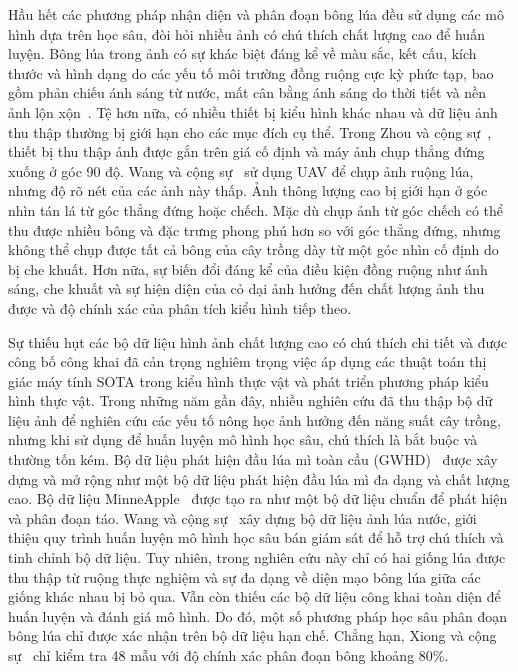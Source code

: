 \documentclass[12pt, a4paper]{article}
\begin{document}
Hầu hết các phương pháp nhận diện và phân đoạn bông lúa đều sử dụng các mô hình dựa trên
học sâu, đòi hỏi nhiều ảnh có chú thích chất lượng cao để huấn luyện. Bông lúa trong ảnh có
sự khác biệt đáng kể về màu sắc, kết cấu, kích thước và hình dạng do các yếu tố môi trường
đồng ruộng cực kỳ phức tạp, bao gồm phản chiếu ánh sáng từ nước, mất cân bằng ánh sáng do
thời tiết và nền ảnh lộn xộn~\cite{xiong2017}. Tệ hơn nữa, có nhiều thiết bị kiểu hình khác
nhau và dữ liệu ảnh thu thập thường bị giới hạn cho các mục đích cụ thể. Trong Zhou và cộng
sự~\cite{zhou2023}, thiết bị thu thập ảnh được gắn trên giá cố định và máy ảnh chụp thẳng
đứng xuống ở góc 90 độ. Wang và cộng sự~\cite{wang2021} sử dụng UAV để chụp ảnh ruộng lúa,
nhưng độ rõ nét của các ảnh này thấp. Ảnh thông lượng cao bị giới hạn ở góc nhìn tán lá từ
góc thẳng đứng hoặc chếch. Mặc dù chụp ảnh từ góc chếch có thể thu được nhiều bông và đặc
trưng phong phú hơn so với góc thẳng đứng, nhưng không thể chụp được tất cả bông của cây
trồng dày từ một góc nhìn cố định do bị che khuất. Hơn nữa, sự biến đổi đáng kể của điều
kiện đồng ruộng như ánh sáng, che khuất và sự hiện diện của cỏ dại ảnh hưởng đến chất lượng
ảnh thu được và độ chính xác của phân tích kiểu hình tiếp theo.

Sự thiếu hụt các bộ dữ liệu hình ảnh chất lượng cao có chú thích chi tiết và được công bố
công khai đã cản trọng nghiêm trọng việc áp dụng các thuật toán thị giác máy tính SOTA trong
kiểu hình thực vật và phát triển phương pháp kiểu hình thực vật. Trong những năm gần đây,
nhiều nghiên cứu đã thu thập bộ dữ liệu ảnh để nghiên cứu các yếu tố nông học ảnh hưởng đến
năng suất cây trồng, nhưng khi sử dụng để huấn luyện mô hình học sâu, chú thích là bắt buộc
và thường tốn kém. Bộ dữ liệu phát hiện đầu lúa mì toàn cầu (GWHD)~\cite{david2020,
david2021} được xây dựng và mở rộng như một bộ dữ liệu phát hiện đầu lúa mì đa dạng và chất
lượng cao. Bộ dữ liệu MinneApple~\cite{hani2020} được tạo ra như một bộ dữ liệu chuẩn để
phát hiện và phân đoạn táo. Wang và cộng sự~\cite{wang2021} xây dựng bộ dữ liệu ảnh lúa
nước, giới thiệu quy trình huấn luyện mô hình học sâu bán giám sát để hỗ trợ chú thích và
tinh chỉnh bộ dữ liệu. Tuy nhiên, trong nghiên cứu này chỉ có hai giống lúa được thu thập từ
ruộng thực nghiệm và sự đa dạng về diện mạo bông lúa giữa các giống khác nhau bị bỏ qua.
Vẫn còn thiếu các bộ dữ liệu công khai toàn diện để huấn luyện và đánh giá mô hình. Do đó,
một số phương pháp học sâu phân đoạn bông lúa chỉ được xác nhận trên bộ dữ liệu hạn chế.
Chẳng hạn, Xiong và cộng sự~\cite{xiong2017} chỉ kiểm tra 48 mẫu với độ chính xác phân đoạn
bông khoảng 80\%.
\end{document}

